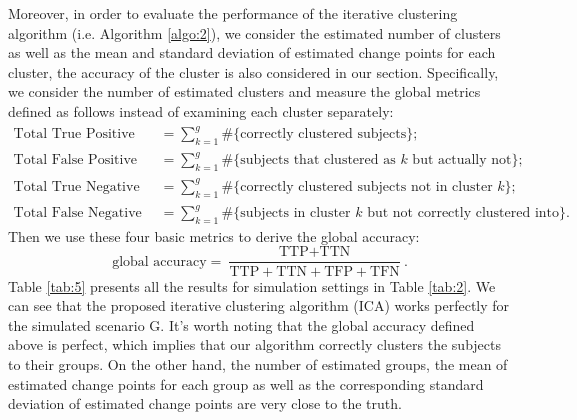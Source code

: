 \documentclass[11pt]{article}
\begin{document}
Moreover, in order to evaluate the performance of the iterative clustering algorithm (i.e. Algorithm \ref{algo:2}), we consider the estimated number of clusters as well as the mean and standard deviation of estimated change points for each cluster, the accuracy of the cluster is also considered in our section. Specifically, we consider the number of estimated clusters and measure the global metrics defined as follows instead of examining each cluster separately:
\begin{equation*}
    \begin{aligned}
        \text{Total True Positive (TTP)} &= \sum_{k=1}^g \#\{\text{correctly clustered subjects}\}; \\
        \text{Total False Positive (TFP)} &= \sum_{k=1}^g \#\{\text{subjects that clustered as $k$ but actually not}\}; \\
        \text{Total True Negative (TTN)} &= \sum_{k=1}^g \#\{\text{correctly clustered subjects not in cluster $k$}\}; \\
        \text{Total False Negative (TFN)} &= \sum_{k=1}^g \#\{\text{subjects in cluster $k$ but not correctly clustered into}\}.
    \end{aligned}
\end{equation*}
Then we use these four basic metrics to derive the global accuracy:
\begin{equation*}
    \text{global accuracy} = \frac{\text{TTP} + \text{TTN}}{\text{TTP} + \text{TTN} + \text{TFP} + \text{TFN}}.
\end{equation*}
Table \ref{tab:5} presents all the results for simulation settings in Table \ref{tab:2}. We can see that the proposed iterative clustering algorithm (ICA) works perfectly for the simulated scenario G. It's worth noting that the global accuracy defined above is perfect, which implies that our algorithm correctly clusters the subjects to their groups. On the other hand, the number of estimated groups, the mean of estimated change points for each group as well as the corresponding standard deviation of estimated change points are very close to the truth.
\begin{table}[!ht]
    \centering
    \caption{Performance for iterative clustering algorithm (ICA) in scenario G.}
    \label{tab:5}
\end{table}
\end{document}

